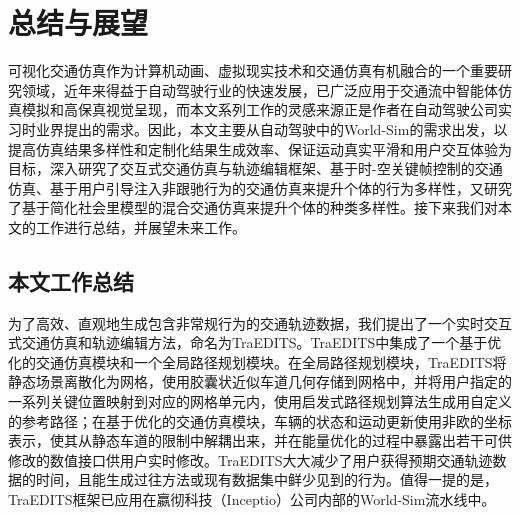 

\chapter{总结与展望}

可视化交通仿真作为计算机动画、虚拟现实技术和交通仿真有机融合的一个重要研究领域，近年来得益于自动驾驶行业的快速发展，已广泛应用于交通流中智能体仿真模拟和高保真视觉呈现，而本文系列工作的灵感来源正是作者在自动驾驶公司实习时业界提出的需求。因此，本文主要从自动驾驶中的World-Sim的需求出发，以提高仿真结果多样性和定制化结果生成效率、保证运动真实平滑和用户交互体验为目标，深入研究了交互式交通仿真与轨迹编辑框架、基于时-空关键帧控制的交通仿真、基于用户引导注入非跟驰行为的交通仿真来提升个体的行为多样性，又研究了基于简化社会里模型的混合交通仿真来提升个体的种类多样性。接下来我们对本文的工作进行总结，并展望未来工作。




\section{本文工作总结}

为了高效、直观地生成包含非常规行为的交通轨迹数据，我们提出了一个实时交互式交通仿真和轨迹编辑方法，命名为TraEDITS。TraEDITS中集成了一个基于优化的交通仿真模块和一个全局路径规划模块。在全局路径规划模块，TraEDITS将静态场景离散化为网格，使用胶囊状近似车道几何存储到网格中，并将用户指定的一系列关键位置映射到对应的网格单元内，使用启发式路径规划算法生成用自定义的参考路径；在基于优化的交通仿真模块，车辆的状态和运动更新使用非欧的坐标表示，使其从静态车道的限制中解耦出来，并在能量优化的过程中暴露出若干可供修改的数值接口供用户实时修改。TraEDITS大大减少了用户获得预期交通轨迹数据的时间，且能生成过往方法或现有数据集中鲜少见到的行为。值得一提的是，TraEDITS框架已应用在嬴彻科技（Inceptio）公司内部的World-Sim流水线中。

